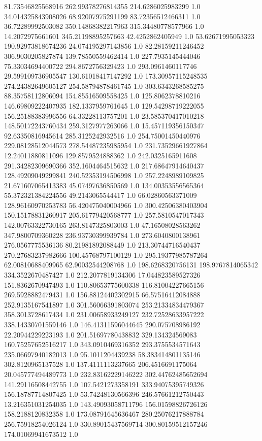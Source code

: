 81.73546825568916	262.99378276814355	214.6286025983299	1.0
34.014325843908026	68.92007975291199	83.72356512466311	1.0
36.72289992503082	350.14868382217963	315.34480778577966	1.0
14.2072975661601	345.21198895257663	42.4252862405949	1.0
53.62671995053323	190.92973818674236	24.074195297143856	1.0
82.28159211246452	306.9030205827874	139.78550559462414	1.0
227.7935145444046	75.33034694400722	294.8672756329423	1.0
293.0961460117746	29.599109736905547	130.61018417147292	1.0
173.30957115248535	274.24382649605127	254.58794878461745	1.0
303.6343268585275	88.35758112806094	154.85516509558425	1.0
125.8062378810216	146.69809222407935	182.1337959761645	1.0
129.54298719222055	156.25188383996556	64.33228113757201	1.0
23.585370417010218	148.50172243760434	259.3127977263066	1.0
15.457119356150347	92.63350816945614	285.3125242932516	1.0
254.75001450440976	229.08128512044573	278.54487235985954	1.0
231.73529661927864	12.24011880811096	129.8579524888362	1.0
242.0325165911608	291.34282309690366	352.1604464515632	1.0
217.68647914640437	128.49209049299841	240.52353194506998	1.0
257.2248989109825	21.671607065413383	45.07497636850569	1.0
134.00353556565364	55.372321384224556	49.2143065544417	1.0
66.02860563371009	128.96160970253783	56.420475040004966	1.0
300.42506380403904	150.15178831260917	205.61779420568777	1.0
257.5810547017343	142.00763322730165	263.8147325803003	1.0
47.16508028563262	347.9800709360228	236.93730399939784	1.0
273.6040800138961	276.0567775536136	80.21981892088449	1.0
213.30744716540437	270.27683237982666	100.45768797100129	1.0
295.19377985787264	62.00810688409965	62.90032544208768	1.0
198.6268320756131	198.9767814065342	334.3522670487427	1.0
212.2077819134306	17.044823589527326	151.8362670947493	1.0
110.80653775600338	116.81004227665156	269.5928882479431	1.0
156.88124402302915	66.57516412084888	252.9135167541897	1.0
301.56066391803074	253.21334834479367	358.3013728617434	1.0
231.00658933249127	232.72528633957222	338.14330701559146	1.0
146.41311596044645	290.075708986192	22.20944229223193	1.0
201.51697780438832	329.134324569083	160.75257652516217	1.0
343.0910469316352	293.3755534571643	235.06697940182013	1.0
95.1011204439238	58.383414801135146	302.8120965137528	1.0
137.4111113237665	206.4516691175064	20.045777494489773	1.0
232.83162229146222	302.44762485652694	141.29116508442755	1.0
107.5421273358191	333.94075395749326	156.18787714807425	1.0
53.74248130566396	246.57661212750443	13.216351031254035	1.0
143.49093058711796	156.01598826726126	158.2188120832358	1.0
173.08791645636467	280.25076217888784	256.75918254026124	1.0
330.89015437569714	300.80159512157246	174.01069941673512	1.0
